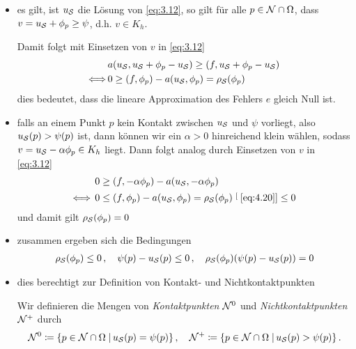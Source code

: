\begin{itemize}
\item es gilt, ist $u_{\mathcal S}$ die Lösung von \eqref{eq:3.12}, so gilt für alle $p \in \mathcal N \cap \Omega$, dass $v = u_{\mathcal S} + \phi_p  \ge \psi$, d.h. $v \in K_h$.

Damit folgt mit Einsetzen von $v$ in  \eqref{eq:3.12}
\begin{align}\notag
	&a(u_{\mathcal S}, u_{\mathcal S} + \phi_p - u_{\mathcal S}) \ge (f,u_{\mathcal S}+\phi_p-u_{\mathcal S}) \\
	\label{eq:4.20}
	\Longleftrightarrow \,  & 0 \ge (f,\phi_p)-a(u_{\mathcal S},\phi_p) = \rho_{\mathcal S}(\phi_p)
\end{align}
dies bedeutet, dass die lineare Approximation des Fehlers $e$ gleich Null ist.

\item falls an einem Punkt $p$ kein Kontakt zwischen $u_{\mathcal S}$ und $\psi$ vorliegt, also $u_{\mathcal S} (p) > \psi(p)$ ist, dann können wir ein $\alpha > 0$ hinreichend klein wählen, sodass $v = u_{\mathcal S} - \alpha \phi_p \in K_h$ liegt. Dann folgt analog durch Einsetzen von $v$ in \eqref{eq:3.12}
\begin{align*}
	0 & \ge (f,-\alpha \phi_p) - a(u_{\mathcal S},-\alpha\phi_p) \\
	\Longleftrightarrow \, 0 & \le (f,\phi_p) - a(u_{\mathcal S},\phi_p) = \rho_{\mathcal S} (\phi_p) \stackrel[\scriptsize\eqref{eq:4.20}]{}\le 0
\end{align*}
und damit gilt $\rho_{\mathcal S} (\phi_p) = 0$

\item zusammen ergeben sich die Bedingungen
\begin{align}\label{eq:4.21}
	\rho_{\mathcal S} (\phi_p) \le 0 \, , \quad \psi(p)-u_{\mathcal S} (p) \le 0 \, , \quad \rho_{\mathcal S} (\phi_p) (\psi(p)-u_{\mathcal S} (p)) = 0
\end{align}

\item dies berechtigt zur Definition von Kontakt- und Nichtkontaktpunkten
\begin{defi}
Wir definieren die Mengen von \textit{Kontaktpunkten} $\mathcal N^0$ und \textit{Nichtkontaktpunkten} $\mathcal N^+$ durch
\begin{align*}
	\mathcal N^0 \coloneqq  \{p \in \mathcal N \cap \Omega \;\vert\, u_{\mathcal S}(p) = \psi (p) \} \, , \quad 
	\mathcal N^+ \coloneqq  \{p \in \mathcal N \cap \Omega \;\vert\, u_{\mathcal S}(p) > \psi (p) \}\, .
\end{align*}
\end{defi}


\end{itemize}
